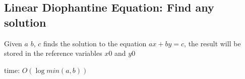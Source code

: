 \subsection{Linear Diophantine Equation: Find any solution}

Given $a$ $b$, $c$ finds the solution to the equation $ax + by = c$, the result will be stored in the reference variables $x0$ and $y0$

time: $O(\log{min(a,b)})$
